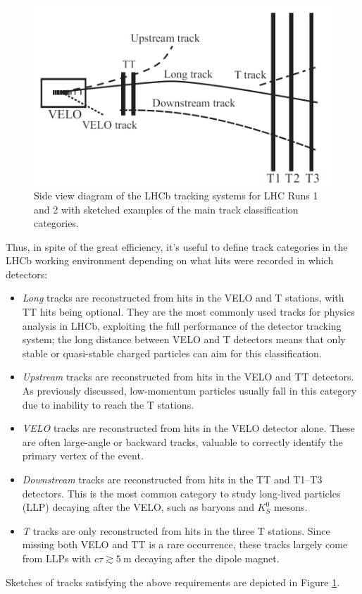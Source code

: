 \begin{figure}[t]
	\centering
	\includegraphics[width=.8\textwidth]{graphics/02-lhcb/Track_Definitions.png}
	\caption[Side view diagram of LHCb tracking system and track categories.]{Side view diagram of the LHCb tracking systems for LHC Runs 1 and 2 with sketched examples of the main track classification categories.}
	\label{fig:2:track_classification}
\end{figure}

Thus, in spite of the great efficiency, it's useful to define track categories in the LHCb working environment depending on what hits were recorded in which detectors:
\begin{itemize}
	\item \textit{Long} tracks are reconstructed from hits in the VELO and T stations, with TT hits being optional. They are the most commonly used tracks for physics analysis in LHCb, exploiting the full performance of the detector tracking system; the long distance between VELO and T detectors means that only stable or quasi-stable charged particles can aim for this classification.
	\item \textit{Upstream} tracks are reconstructed from hits in the VELO and TT detectors. As previously discussed, low-momentum particles usually fall in this category due to inability to reach the T stations.
	\item \textit{VELO} tracks are reconstructed from hits in the VELO detector alone. These are often large-angle or backward tracks, valuable to correctly identify the primary vertex of the event.
	\item \textit{Downstream} tracks are reconstructed from hits in the TT and T1--T3 detectors. This is the most common category to study long-lived particles (LLP) decaying after the VELO, such as \lz baryons and $K_S^0$ mesons.
	\item \textit{T} tracks are only reconstructed from hits in the three T stations. Since missing both VELO and TT is a rare occurrence, these tracks largely come from LLPs with $c\tau \gtrsim \SI{5}{\meter}$ decaying after the dipole magnet.
\end{itemize}
Sketches of tracks satisfying the above requirements are depicted in Figure \ref{fig:2:track_classification}.

